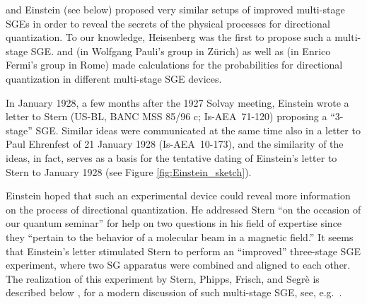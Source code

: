 \documentclass{article}
\begin{document}
\cite{HeisenbergW1927Inhalt} and Einstein (see below) proposed very similar setups of improved multi-stage SGEs in order to reveal the secrets of the physical processes for directional quantization. To our knowledge, Heisenberg was the first to propose such a multi-stage SGE. \cite{HeisenbergW1927Inhalt} and \cite{GuettingerP1932Verhalten}  (in Wolfgang Pauli's group in Zürich) as well as \cite{MajoranaE1932Atomi} (in Enrico Fermi's group in Rome) made calculations for the probabilities for directional quantization in different multi-stage SGE devices. 

In January 1928, a few months after the 1927 Solvay meeting, Einstein wrote a letter to Stern (US-BL, BANC MSS 85/96 c; Is-AEA~71-120) proposing a ``3-stage'' SGE. Similar ideas were communicated at the same time also in a letter to Paul Ehrenfest of 21 January 1928 (Is-AEA~10-173), and the similarity of the ideas, in fact, serves as a basis for the tentative dating of Einstein's letter to Stern to January 1928 (see Figure \ref{fig:Einstein_sketch}).


Einstein hoped that such an experimental device could reveal more information on the process of directional quantization. He addressed Stern ``on the occasion of our quantum seminar'' for help on two  questions in his field of expertise since they ``pertain to the behavior of a molecular beam in a magnetic field.'' It seems that Einstein's letter stimulated Stern to perform an ``improved'' three-stage SGE experiment, where two SG apparatus were combined and aligned to each other. The realization of this experiment by Stern, Phipps, Frisch, and Segrè is described below \citep{PhippsTEtal1932Einstellung,FrischOEtal1933Einstellung}, for a modern discussion of such multi-stage SGE, see, e.g.\ \cite[ch.~XIII]{BohmA1993Mechanics}. 
\end{document}
